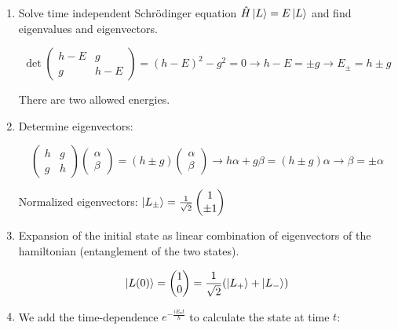 \begin{enumerate}
    \item Solve time independent Schr\"odinger equation $\hat{H}\ket{L}=E\ket{L}$ and find eigenvalues and eigenvectors.

        $$\det\begin{pmatrix}h-E&g\\g&h-E\end{pmatrix}=(h-E)^2-g^2=0 \rightarrow h-E=\pm g \rightarrow E_{\pm}=h\pm g$$

        There are two allowed energies.
    \item Determine eigenvectors:

        $$\begin{pmatrix}h&g\\g&h\end{pmatrix}\begin{pmatrix}\alpha\\\beta\end{pmatrix}=(h\pm g)\begin{pmatrix}\alpha\\\beta\end{pmatrix} \rightarrow h\alpha + g\beta = (h\pm g)\alpha \rightarrow \beta = \pm\alpha$$

        Normalized eigenvectors: $\ket{L_{\pm}}=\frac{1}{\sqrt{2}}\begin{pmatrix}1\\\pm 1\end{pmatrix}$
    \item Expansion of the initial state as linear combination of eigenvectors of the hamiltonian (entanglement of the two states).

        $$\ket{L(0)}=\begin{pmatrix}1\\0\end{pmatrix}=\frac{1}{\sqrt{2}}(\ket{L_+}+\ket{L_-})$$

    \item We add the time-dependence $e^{-\frac{iE_nt}{\hbar}}$ to calculate the state at time $t$:


\end{enumerate}
